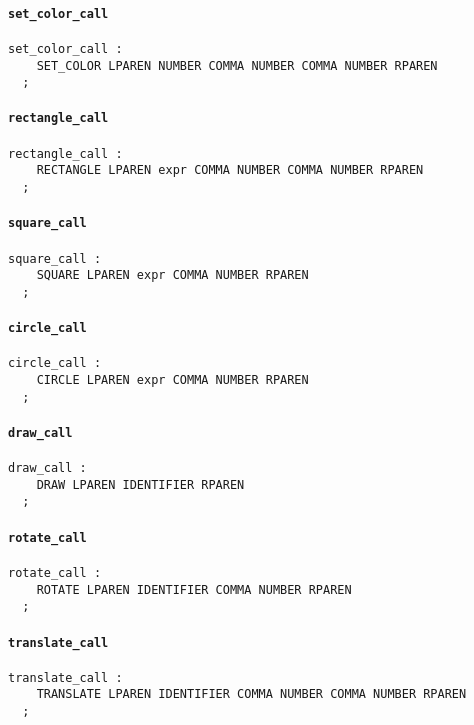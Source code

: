 \documentclass[12pt,a4paper]{article}
\begin{document}
\paragraph*{\texttt{set\_color\_call}}
\begin{verbatim}
set_color_call :
    SET_COLOR LPAREN NUMBER COMMA NUMBER COMMA NUMBER RPAREN
  ;
\end{verbatim}

\paragraph*{\texttt{rectangle\_call}}
\begin{verbatim}
rectangle_call :
    RECTANGLE LPAREN expr COMMA NUMBER COMMA NUMBER RPAREN
  ;
\end{verbatim}

\paragraph*{\texttt{square\_call}}
\begin{verbatim}
square_call :
    SQUARE LPAREN expr COMMA NUMBER RPAREN
  ;
\end{verbatim}

\paragraph*{\texttt{circle\_call}}
\begin{verbatim}
circle_call :
    CIRCLE LPAREN expr COMMA NUMBER RPAREN
  ;
\end{verbatim}

\paragraph*{\texttt{draw\_call}}
\begin{verbatim}
draw_call :
    DRAW LPAREN IDENTIFIER RPAREN
  ;
\end{verbatim}

\paragraph*{\texttt{rotate\_call}}
\begin{verbatim}
rotate_call :
    ROTATE LPAREN IDENTIFIER COMMA NUMBER RPAREN
  ;
\end{verbatim}

\paragraph*{\texttt{translate\_call}}
\begin{verbatim}
translate_call :
    TRANSLATE LPAREN IDENTIFIER COMMA NUMBER COMMA NUMBER RPAREN
  ;
\end{verbatim}
\end{document}

